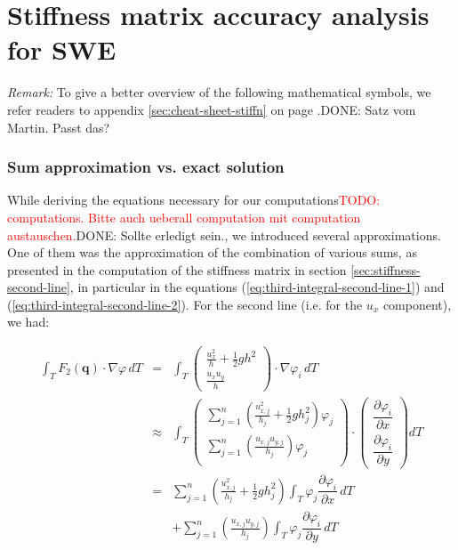 \documentclass{article}
\newcommand{\todo}[2][]{\textcolor{red}{TODO\ifthenelse{\equal{#1}{}}{}{[#1]}: #2}}
\newcommand{\done}[2][]{\textcolor{green!50!black}{DONE\ifthenelse{\equal{#1}{}}{}{[#1]}: #2}}
\newcommand{\pd}[2]{\dfrac{\partial #1}{\partial #2}}
\renewcommand{\phi}{\varphi}
\begin{document}
\clearpage{}

\part{Stiffness matrix accuracy analysis for SWE}
\label{part:stiffness-matrix}

\emph{Remark:} To give a better overview of the following mathematical symbols, we refer readers to appendix \ref{sec:cheat-sheet-stiffn} on page \pageref{sec:cheat-sheet-stiffn}.\done{Satz vom Martin. Passt das?}

\section{Sum approximation vs. exact solution}
\label{sec:point-wise-appr-vs-exact-solution-intro}

While deriving the equations necessary for our computations\todo{computations. Bitte auch ueberall computation mit computation austauschen.}\done{Sollte erledigt sein.}, we introduced several approximations. One of them was the approximation of the combination of various sums, as presented in the computation of the stiffness matrix in section \ref{sec:stiffness-second-line}, in particular in the equations (\ref{eq:third-integral-second-line-1}) and (\ref{eq:third-integral-second-line-2}). For the second line (i.e. for the $u_x$ component), we had:

\begin{eqnarray}
  \label{eq:third-integral-second-line-1-analysis-part}
  \int_T F_2(\mathbf{q}) \cdot \nabla \phi \, dT & = &
  \int_T
  \begin{pmatrix}
    \frac{u_x^2}{h} + \frac{1}{2} g h^2 \\ \frac{u_x u_y}{h}
  \end{pmatrix}
  \cdot \nabla \phi_i \, dT \\
  \label{eq:third-integral-second-line-2-analysis-part}
  & \approx &
  \int_T
  \begin{pmatrix}
    \sum_{j=1}^n \left(\frac{u_{x,j}^2}{h_j} + \frac{1}{2} g h_j^2\right) \phi_j \\
    \sum_{j=1}^n \left(\frac{u_{x,j} u_{y,j}}{h_j}\right) \phi_j \\
  \end{pmatrix}
  \cdot
  \begin{pmatrix}
    \pd{\phi_i}{x} \\
    \pd{\phi_i}{y}
  \end{pmatrix} dT \\
  & = & \nonumber \sum_{j=1}^n \left(\frac{u_{x,j}^2}{h_j} + \frac{1}{2} g h_j^2\right) \int_T \phi_j \pd{\phi_i}{x} \, dT \\
  & {} & + \nonumber \sum_{j=1}^n \left(\frac{u_{x,j} u_{y,j}}{h_j}\right) \int_T \phi_j \pd{\phi_i}{y} \, dT
\end{eqnarray}
\end{document}
